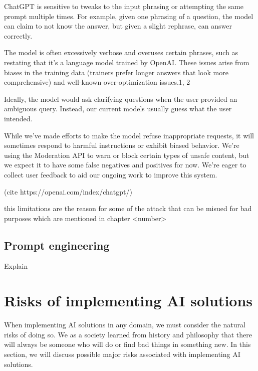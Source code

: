 ChatGPT is sensitive to tweaks to the input phrasing or attempting the same prompt multiple times. For example, given one phrasing of a question, the model can claim to not know the answer, but given a slight rephrase, can answer correctly.

The model is often excessively verbose and overuses certain phrases, such as restating that it’s a language model trained by OpenAI. These issues arise from biases in the training data (trainers prefer longer answers that look more comprehensive) and well-known over-optimization issues.1, 2

Ideally, the model would ask clarifying questions when the user provided an ambiguous query. Instead, our current models usually guess what the user intended.

While we’ve made efforts to make the model refuse inappropriate requests, it will sometimes respond to harmful instructions or exhibit biased behavior. We’re using the Moderation API to warn or block certain types of unsafe content, but we expect it to have some false negatives and positives for now. We’re eager to collect user feedback to aid our ongoing work to improve this system.


(cite https://openai.com/index/chatgpt/)

this limitations are the reason for some of the attack that can be misued for bad purposes which are mentioned in chapter <number>







\subsection{Prompt engineering}
Explain


\section{Risks of implementing AI solutions}
When implementing AI solutions in any domain, we must consider the natural risks of doing so. We as a society learned from history and philosophy that there will always be someone who will do or find bad things in something new. In this section, we will discuss possible major risks associated with implementing AI solutions.

